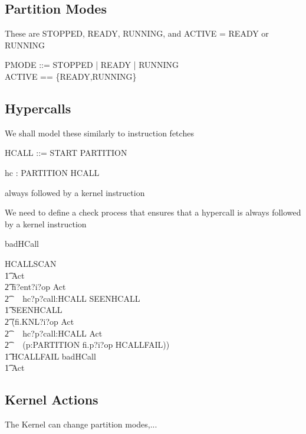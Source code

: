 \subsection{Partition Modes}
  These are STOPPED, READY, RUNNING, and ACTIVE = READY or RUNNING

\begin{circus}
PMODE ::= STOPPED | READY | RUNNING\\
ACTIVE == \{READY,RUNNING\}
\end{circus}

\subsection{Hypercalls }

We shall model these similarly to instruction fetches

\begin{circus}
HCALL ::= START \ldata PARTITION \rdata
\end{circus}
\begin{circus}
\circchannel hc : PARTITION \cross HCALL
\end{circus}
always followed by a kernel instruction

We need to define a check process that ensures that a hypercall is always
followed by a kernel instruction
\begin{circus}
	\circchannel badHCall
\end{circus}
\begin{circus}
\circprocess HCALLSCAN \circdef \circbegin
\\ \t1 Act \circdef
\\ \t2 fi?ent?i?op \then  Act
\\ \t2 ~\extchoice~  hc?p?call:HCALL \then  SEENHCALL
\\ \t1 SEENHCALL \circdef
\\ \t2 (fi.KNL?i?op \then  Act
\\ \t2 ~\extchoice~  hc?p?call:HCALL \then  Act
\\ \t2 ~\extchoice~  (\Extchoice  p:PARTITION \circspot fi.p?i?op \then  HCALLFAIL))
\\ \t1 HCALLFAIL \circdef badHCall \then  \Stop
\\ \t1 \circspot Act\\
\circend

\end{circus}

\subsection{Kernel Actions}
  The Kernel can change partition modes,...


